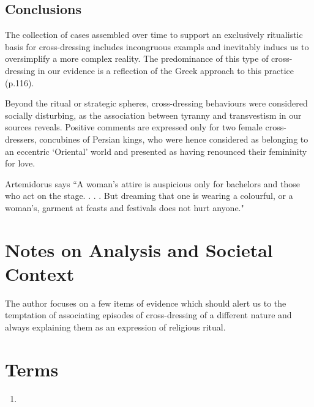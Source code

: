 \subsection{Conclusions}

The collection of cases assembled over time to support an exclusively ritualistic basis for cross-dressing includes incongruous exampls and inevitably inducs us to oversimplify a more complex reality. The predominance of this type of cross-dressing in our evidence is a reflection of the Greek approach to this practice (p.116).

Beyond the ritual or strategic spheres, cross-dressing behaviours were considered socially disturbing, as the association between tyranny and transvestism in our sources reveals. Positive comments are expressed only for two female cross-dressers, concubines of Persian kings, who were hence considered as belonging to an eccentric `Oriental' world and presented as having renounced their femininity for love.

\begin{rmk}
    Artemidorus says ``A woman's attire is auspicious only for bachelors and those who act on the stage. . . . But dreaming that one is wearing a colourful, or a woman's, garment at feasts and festivals does not hurt anyone."
\end{rmk}




\section{Notes on Analysis and Societal Context}
\label{sec:SocCont11}

The author focuses on a few items of evidence which should alert us to the temptation of associating episodes of cross-dressing of a different nature and always explaining them as an expression of religious ritual. 


\section{Terms}
\label{sec:terms11}

\begin{enumerate}
	\item
\end{enumerate}


%
%
%


